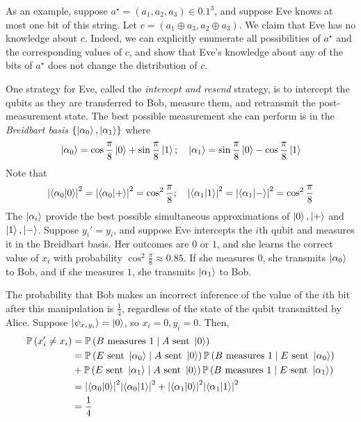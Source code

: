 As an example, suppose \( a^\star = (a_1, a_2, a_3) \in \qty{0,1}^3 \), and suppose Eve knows at most one bit of this string.
Let \( c = (a_1 \oplus a_3, a_2 \oplus a_3) \).
We claim that Eve has no knowledge about \( c \).
Indeed, we can explicitly enumerate all possibilities of \( a^\star \) and the corresponding values of \( c \), and show that Eve's knowledge about any of the bits of \( a^\star \) does not change the distribution of \( c \).

One strategy for Eve, called the \emph{intercept and resend} strategy, is to intercept the qubits as they are transferred to Bob, measure them, and retransmit the post-measurement state.
The best possible measurement she can perform is in the \emph{Breidbart basis} \( \qty{\ket{\alpha_0}, \ket{\alpha_1}} \) where
\[ \ket{\alpha_0} = \cos \frac{\pi}{8} \ket{0} + \sin \frac{\pi}{8} \ket{1};\quad \ket{\alpha_1} = \sin \frac{\pi}{8} \ket{0} - \cos \frac{\pi}{8} \ket{1} \]
Note that
\[ \abs{\ip{\alpha_0}{0}}^2 = \abs{\ip{\alpha_0}{+}}^2 = \cos^2 \frac{\pi}{8};\quad \abs{\ip{\alpha_1}{1}}^2 = \abs{\ip{\alpha_1}{-}}^2 = \cos^2 \frac{\pi}{8} \]
The \( \ket{\alpha_i} \) provide the best possible simultaneous approximations of \( \ket{0}, \ket{+} \) and \( \ket{1}, \ket{-} \).
Suppose \( y_i' = y_i \), and suppose Eve intercepts the \( i \)th qubit and measures it in the Breidbart basis.
Her outcomes are \( 0 \) or \( 1 \), and she learns the correct value of \( x_i \) with probability \( \cos^2 \frac{\pi}{8} \approx 0.85 \).
If she measures \( 0 \), she transmits \( \ket{\alpha_0} \) to Bob, and if she measures \( 1 \), she transmits \( \ket{\alpha_1} \) to Bob.

The probability that Bob makes an incorrect inference of the value of the \( i \)th bit after this manipulation is \( \frac{1}{4} \), regardless of the state of the qubit transmitted by Alice.
Suppose \( \ket{\psi_{x_i y_i}} = \ket{0} \), so \( x_i = 0, y_i = 0 \).
Then,
\begin{align*}
    \prob{x_i' \neq x_i} &= \prob{B \text{ measures } 1 \mid A \text{ sent } \ket{0}} \\
    &= \prob{E \text{ sent } \ket{\alpha_0} \mid A \text{ sent } \ket{0}} \prob{B \text{ measures } 1 \mid E \text{ sent } \ket{\alpha_0}} \\
    &+ \prob{E \text{ sent } \ket{\alpha_1} \mid A \text{ sent } \ket{0}} \prob{B \text{ measures } 1 \mid E \text{ sent } \ket{\alpha_1}} \\
    &= \abs{\ip{\alpha_0}{0}}^2 \abs{\ip{\alpha_0}{1}}^2 + \abs{\ip{\alpha_1}{0}}^2 \abs{\ip{\alpha_1}{1}}^2 \\
    &= \frac{1}{4}
\end{align*}
